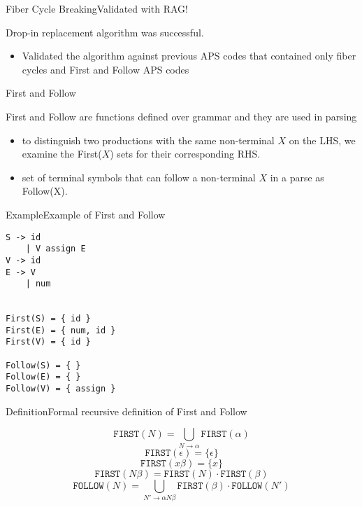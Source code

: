 \begin{frame}{Fiber Cycle Breaking}{Validated with RAG!}

\alert{Drop-in replacement} algorithm was successful.

\begin{itemize}
    \item Validated the algorithm against \alert{previous APS codes} that contained only fiber cycles and First and Follow APS codes
\end{itemize}

\end{frame}

\begin{frame}[fragile=singleslide]{First and Follow}{}

\alert{First} and \alert{Follow} are functions defined over grammar and they are used in \alert{parsing}

\begin{itemize}
    \item to distinguish two productions with the same non-terminal $X$ on the LHS, we examine the First($X$) sets for their corresponding RHS.
    \item set of terminal symbols that can follow a non-terminal $X$ in a parse as Follow(X).
\end{itemize}

\end{frame}

\begin{frame}[fragile=singleslide]{Example}{Example of First and Follow}

\begin{multicols}{2}
\begin{Verbatim}[fontsize=\small]
S -> id
    | V assign E
V -> id
E -> V
    | num


First(S) = { id }
First(E) = { num, id }
First(V) = { id }

Follow(S) = { }
Follow(E) = { }
Follow(V) = { assign }
\end{Verbatim}
\end{multicols}

\end{frame}

\begin{frame}{Definition}{Formal recursive definition of First and Follow}

\[ \texttt{FIRST}(N) = \bigcup_{N \to \alpha} \texttt{FIRST}(\alpha) \]
\[ \texttt{FIRST}(\epsilon)   = \{ \epsilon \} \]
\[ \texttt{FIRST}(x \beta)   =\{x\} \]
\[ \texttt{FIRST}(N \beta)   =   \texttt{FIRST}(N) \cdot \texttt{FIRST}(\beta)  \]
\[ \texttt{FOLLOW}(N) = \bigcup_{N' \to \alpha N \beta} \texttt{FIRST}(\beta) \cdot \texttt{FOLLOW}(N') \]


\end{frame}


